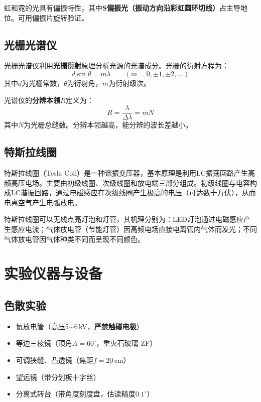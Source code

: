 \documentclass[UTF8]{article}
\begin{document}
虹和霓的光具有偏振特性，其中\textbf{S偏振光（振动方向沿彩虹圆环切线）}占主导地位。可用偏振片旋转验证。

\subsection{光栅光谱仪}

光栅光谱仪利用\textbf{光栅衍射}原理分析光源的光谱成分。光栅的衍射方程为：
\[
d \sin\theta = m\lambda \qquad (m = 0, \pm 1, \pm 2, \ldots)
\]
其中$d$为光栅常数，$\theta$为衍射角，$m$为衍射级次。

光谱仪的\textbf{分辨本领}$R$定义为：
\[
R = \frac{\lambda}{\Delta\lambda} = mN
\]
其中$N$为光栅总缝数。分辨本领越高，能分辨的波长差越小。

\subsection{特斯拉线圈}

特斯拉线圈（Tesla Coil）是一种谐振变压器，基本原理是利用LC振荡回路产生高频高压电场。主要由初级线圈、次级线圈和放电端三部分组成。初级线圈与电容构成LC谐振回路，通过电磁感应在次级线圈产生极高的电压（可达数十万伏），从而电离空气产生电弧放电。

特斯拉线圈可以无线点亮灯泡和灯管，其机理分别为：LED灯泡通过电磁感应产生感应电流；气体放电管（节能灯管）因高频电场直接电离管内气体而发光；不同气体放电管因气体种类不同而呈现不同颜色。

\section{实验仪器与设备}

\subsection{色散实验}
\begin{itemize}
    \item 氦放电管（高压5$\sim$6\,kV，\textbf{严禁触碰电极}）
    \item 等边三棱镜（顶角$A = 60^\circ$，重火石玻璃 ZF）
    \item 可调狭缝、凸透镜（焦距$f = 20$\,cm）
    \item 望远镜（带分划板十字丝）
    \item 分离式转台（带角度刻度盘，估读精度$0.1^\circ$）
\end{itemize}
\end{document}
